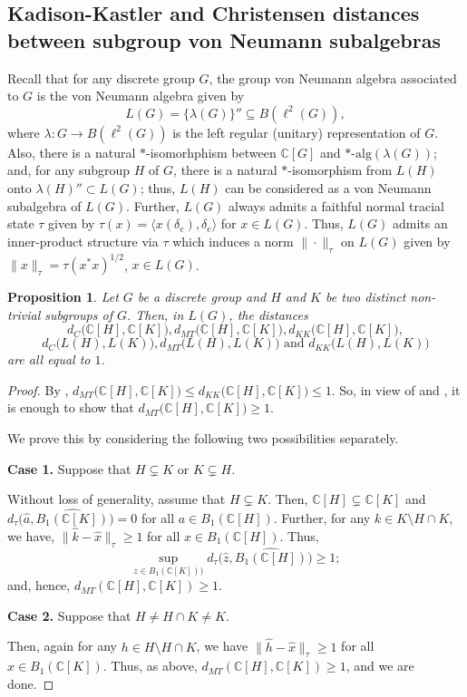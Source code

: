 \documentclass{amsart}
\numberwithin{equation}{section}
\newcommand{\mbb}{\mathbb}
\newcommand{\C}{\mathbb C}
\newcommand{\1}{\mathbf{1}}
\newtheorem{proposition}[theorem]{Proposition}
\begin{document}
\subsection{Kadison-Kastler and Christensen distances between subgroup  von Neumann subalgebras}
Recall that for any discrete group $G$, the group von Neumann algebra
associated to $G$ is the von Neumann algebra given by
\[
L(G) =
\{\lambda(G)\}'' \subseteq B(\ell^2(G)),
\]
where $\lambda: G \to B(\ell^2(G) ) $ is the left regular (unitary)
representation of $G$. Also, there is a natural $*$-isomorhphism
between $\C[G]$ and $*$-$\text{alg}(\lambda(G))$; and, for any subgroup
$H$ of $G$, there is a natural $*$-isomorphism from $L(H)$ onto
$\lambda(H)''\subset L(G)$; thus,
$L(H)$ can be considered as a von Neumann subalgebra of
$L(G)$. Further, $L(G)$ always admits a faithful normal tracial state
$\tau$ given by $\tau(x) = \langle x(\delta_e), \delta_e\rangle$ for
$x \in L(G)$. Thus, $L(G)$ admits an inner-product structure via
$\tau$ which induces a norm $\|\cdot \|_\tau$ on $L(G)$ given by
$\|x\|_\tau = \tau(x^*x)^{1/2}$, $x \in L(G)$.


\begin{proposition}\label{distances-gp-vNas}
Let $G$ be a discrete group and $H$ and $K$ be two distinct
non-trivial subgroups of $ G$.  Then, in $L(G)$, the distances
\[
d_C\big(\mathbb{C}[H], \mathbb{C}[K]\big), d_{MT} \big(\mathbb{C}[H],
\mathbb{C}[K]\big), d_{KK}\big(\mathbb{C}[H], \mathbb{C}[K]\big),
\]
\[
d_C\big(L(H), L(K)\big), 
d_{MT}\big(L(H), L(K)\big)\text{ and } d_{KK}\big(L(H), L(K)\big)
\]
are all equal  to $1$.
\end{proposition}

\begin{proof}
By , \( d_{MT} \big(\mathbb{C}[H],  \mathbb{C}[K]\big) \leq d_{KK}
\big(\mathbb{C}[H],  \mathbb{C}[K]\big) \leq 1\). So, in view of 
and , it is enough to show that \( d_{MT} \big(\mathbb{C}[H], 
\mathbb{C}[K]\big) \geq 1\).

We prove this by considering the following two
possibilities separately.\smallskip

\noindent \textbf{Case 1.} Suppose that  $H\subsetneq K$ or $K\subsetneq H$.

Without loss of generality, assume that $H \subsetneq K$. Then,
$\mathbb{C}[H]\subsetneq \mathbb{C}[K]$ and \( d_{\tau}\Big(\widehat{a},
\widehat{B_{1}(\mbb{C}[K])}\Big)=0 \) for all $a\in
B_{1}(\mbb{C}[H])$. Further, for any $k
\in K\setminus H \cap K$, we have, \( \|\widehat{k}- \widehat{x} \|_{\tau}\geq 1 \) for all $x \in B_{1}(\mbb{C}[H])$. Thus,
\[
\sup_{z \in B_1(\C[K]))}d_{\tau}\Big(\widehat{z}, \widehat{B_{1}(\mbb{C}[H])}\Big)\geq 1;
\] 
and, hence, $d_{MT}(\mathbb{C}[H], \mathbb{C}[K])\geq 1$. \smallskip

\noindent \textbf{Case 2.} Suppose that $H \neq H\cap K \neq K$.

Then, again for any $h\in H\setminus H\cap K $, we have  
\(
\|\widehat{h}-\widehat{x}\|_{\tau}\geq 1
\) for all $x\in B_{1}(\mbb{C}[K])$.
Thus, as above, $d_{MT}(\mathbb{C}[H], \mathbb{C}[K])\geq 1$, and we are done.
\end{proof}
\end{document}
